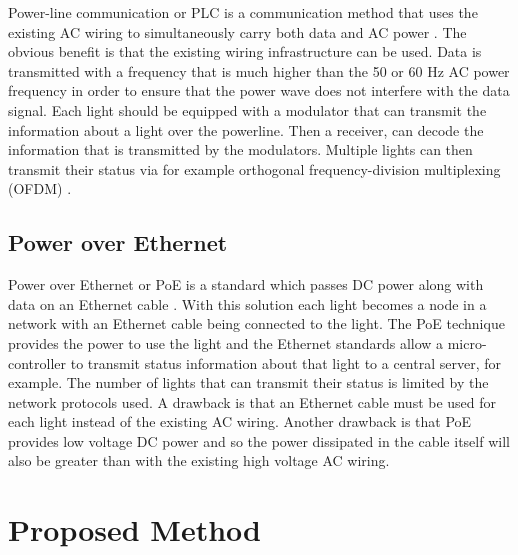 		Power-line communication or PLC is a communication method that uses the existing AC wiring to simultaneously carry both data and AC power \cite{1205458}.
		The obvious benefit is that the existing wiring infrastructure can be used.
		Data is transmitted with a frequency that is much higher than the 50 or 60 Hz AC power frequency in order to ensure that the power wave does not interfere with the data signal.
		Each light should be equipped with a modulator that can transmit the information about a light over the powerline.
		Then a receiver, can decode the information that is transmitted by the modulators.
		Multiple lights can then transmit their status via for example orthogonal frequency-division multiplexing (OFDM) \cite{hoch2011comparison}.




		\subsection{Power over Ethernet}

		Power over Ethernet or PoE is a standard which passes DC power along with data on an Ethernet cable \cite{patoka2003power}.
		With this solution each light becomes a node in a network with an Ethernet cable being connected to the light.
		The PoE technique provides the power to use the light and the Ethernet standards allow a micro-controller to transmit status information about that light to a central server, for example.
		The number of lights that can transmit their status is limited by the network protocols used.
		A drawback is that an Ethernet cable must be used for each light instead of the existing AC wiring.
		Another drawback is that PoE provides low voltage DC power and so the power dissipated in the cable itself will also be greater than with the existing high voltage AC wiring.




	\section{Proposed Method}

